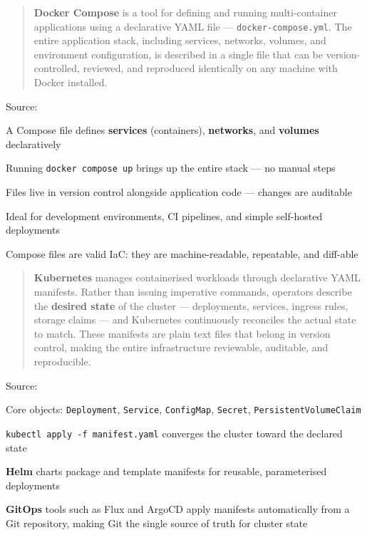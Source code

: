 \documentclass[Screen16to9,17pt]{foils}
\begin{document}


\begin{quote}
{\bf Docker Compose} is a tool for defining and running multi-container applications
using a declarative YAML file — \verb+docker-compose.yml+. The entire application stack,
including services, networks, volumes, and environment configuration, is described
in a single file that can be version-controlled, reviewed, and reproduced identically
on any machine with Docker installed.
\end{quote}

Source: {\footnotesize
{}}

\begin{list2}
\item A Compose file defines {\bf services} (containers), {\bf networks}, and {\bf volumes} declaratively
\item Running \verb+docker compose up+ brings up the entire stack — no manual steps
\item Files live in version control alongside application code — changes are auditable
\item Ideal for development environments, CI pipelines, and simple self-hosted deployments
\item Compose files are valid IaC: they are machine-readable, repeatable, and diff-able
\end{list2}




\begin{quote}
{\bf Kubernetes} manages containerised workloads through declarative YAML manifests.
Rather than issuing imperative commands, operators describe the {\bf desired state}
of the cluster — deployments, services, ingress rules, storage claims — and
Kubernetes continuously reconciles the actual state to match. These manifests
are plain text files that belong in version control, making the entire
infrastructure reviewable, auditable, and reproducible.
\end{quote}

Source: {\footnotesize
{}}

\begin{list2}
\item Core objects: \verb+Deployment+, \verb+Service+, \verb+ConfigMap+, \verb+Secret+, \verb+PersistentVolumeClaim+
\item \verb+kubectl apply -f manifest.yaml+ converges the cluster toward the declared state
\item {\bf Helm} charts package and template manifests for reusable, parameterised deployments 
\item {\bf GitOps} tools such as Flux and ArgoCD apply manifests automatically from a Git repository,
making Git the single source of truth for cluster state
\end{list2}
\end{document}
